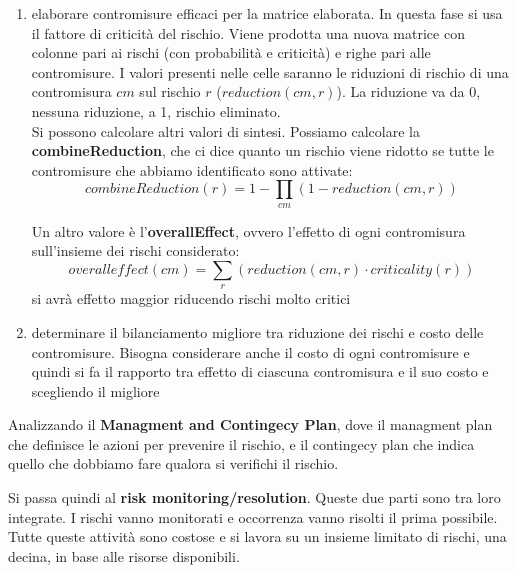 \begin{itemize}
\begin{enumerate}
        \item elaborare contromisure efficaci per la matrice elaborata. In questa fase si usa il fattore di criticità del rischio. Viene prodotta una nuova matrice con colonne pari ai rischi (con probabilità e criticità) e righe pari alle contromisure. I valori presenti nelle celle saranno le riduzioni di rischio di una contromisura $cm$ sul rischio $r$ ($reduction(cm,r)$). La riduzione va da 0, nessuna riduzione, a 1, rischio eliminato. \\
        Si possono calcolare altri valori di sintesi. Possiamo calcolare la \textbf{combineReduction}, che ci dice quanto un rischio viene ridotto se tutte le contromisure che abbiamo identificato sono attivate: \[combineReduction(r)=1-\prod_{cm}(1-reduction(cm, r))\] 
        
        Un altro valore è l'\textbf{overallEffect}, ovvero l'effetto di ogni contromisura sull'insieme dei rischi considerato: \[overalleffect(cm)=\sum_r(reduction(cm,r)\cdot criticality(r))\] si avrà effetto maggior riducendo rischi molto critici \item determinare il bilanciamento migliore tra riduzione dei rischi e costo delle contromisure. Bisogna considerare anche il costo di ogni contromisure e quindi si fa il rapporto tra effetto di ciascuna contromisura e il suo costo e scegliendo il migliore
    \end{enumerate}
\end{itemize}

Analizzando il \textbf{Managment and Contingecy Plan}, dove il managment plan che definisce le azioni per prevenire il rischio, e il contingecy plan che indica quello che dobbiamo fare qualora si verifichi il rischio. 

Si passa quindi al \textbf{risk monitoring/resolution}. Queste due parti sono tra loro integrate. I rischi vanno monitorati e occorrenza vanno risolti il prima possibile. Tutte queste attività sono costose e si lavora su un insieme limitato di rischi, una decina, in base alle risorse disponibili.
